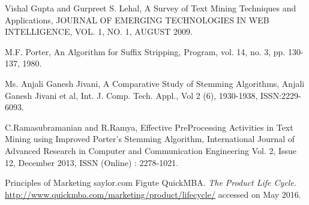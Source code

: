 \begin{thebibliography}{99999}
 Vishal Gupta and Gurpreet S. Lehal, A Survey of Text Mining Techniques and Applications, JOURNAL OF EMERGING TECHNOLOGIES IN WEB INTELLIGENCE, VOL. 1, NO. 1, AUGUST 2009. 

  M.F. Porter, An Algorithm for Suffix Stripping, Program, vol. 14, no. 3, pp. 130-137, 1980.

 Ms. Anjali Ganesh Jivani, A Comparative Study of Stemming Algorithms, Anjali Ganesh Jivani et al, Int. J. Comp. Tech. Appl., Vol 2 (6), 1930-1938, ISSN:2229-6093.

 C.Ramasubramanian and R.Ramya, Effective PreProcessing Activities in Text Mining using Improved Porter's Stemming Algorithm, International Journal of Advanced Research in Computer and Communication Engineering Vol. 2, Issue 12, December 2013, ISSN (Online) : 2278-1021. 

 Principles of Marketing saylor.com
 Figute 
 QuickMBA. \textit{The Product Life Cycle.} \url{http://www.quickmba.com/marketing/product/lifecycle/} accessed on May 2016.

\end{thebibliography}
